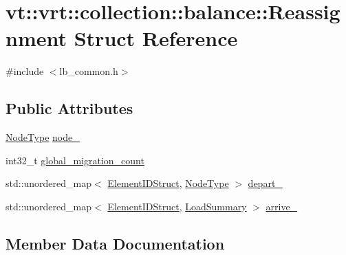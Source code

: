 \hypertarget{structvt_1_1vrt_1_1collection_1_1balance_1_1_reassignment}{}\section{vt\+:\+:vrt\+:\+:collection\+:\+:balance\+:\+:Reassignment Struct Reference}
\label{structvt_1_1vrt_1_1collection_1_1balance_1_1_reassignment}


{\ttfamily \#include $<$lb\+\_\+common.\+h$>$}

\subsection*{Public Attributes}
\begin{DoxyCompactItemize}
\item 
\hyperlink{namespacevt_a866da9d0efc19c0a1ce79e9e492f47e2}{Node\+Type} \hyperlink{structvt_1_1vrt_1_1collection_1_1balance_1_1_reassignment_ab94b05ac3a28d21a1f189f4becbe1240}{node\+\_\+}
\item 
int32\+\_\+t \hyperlink{structvt_1_1vrt_1_1collection_1_1balance_1_1_reassignment_a4887608a57a19a896481f22d2ad11ce2}{global\+\_\+migration\+\_\+count}
\item 
std\+::unordered\+\_\+map$<$ \hyperlink{structvt_1_1vrt_1_1collection_1_1balance_1_1_element_i_d_struct}{Element\+I\+D\+Struct}, \hyperlink{namespacevt_a866da9d0efc19c0a1ce79e9e492f47e2}{Node\+Type} $>$ \hyperlink{structvt_1_1vrt_1_1collection_1_1balance_1_1_reassignment_a8fa0e732209e0f186eb10a15b29a0914}{depart\+\_\+}
\item 
std\+::unordered\+\_\+map$<$ \hyperlink{structvt_1_1vrt_1_1collection_1_1balance_1_1_element_i_d_struct}{Element\+I\+D\+Struct}, \hyperlink{structvt_1_1vrt_1_1collection_1_1balance_1_1_load_summary}{Load\+Summary} $>$ \hyperlink{structvt_1_1vrt_1_1collection_1_1balance_1_1_reassignment_a990e74af25598838b67d2679c82a3eb1}{arrive\+\_\+}
\end{DoxyCompactItemize}


\subsection{Member Data Documentation}
\mbox{\label{structvt_1_1vrt_1_1collection_1_1balance_1_1_reassignment_a990e74af25598838b67d2679c82a3eb1}} 
